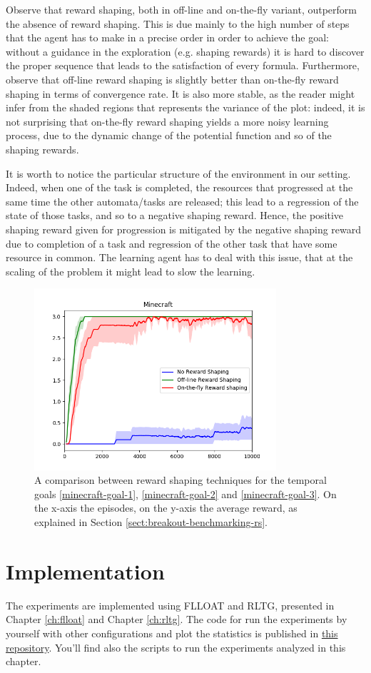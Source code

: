 Observe that reward shaping, both in off-line and on-the-fly variant, outperform the absence of reward shaping. This is due mainly to the high number of steps that the agent has to make in a precise order in order to achieve the goal: without a guidance in the exploration (e.g. shaping rewards) it is hard to discover the proper sequence that leads to the satisfaction of every formula. Furthermore, observe that off-line reward shaping is slightly better than on-the-fly reward shaping in terms of convergence rate. It is also more stable, as the reader might infer from the shaded regions that represents the variance of the plot: indeed, it is not surprising that on-the-fly reward shaping yields a more noisy learning process, due to the dynamic change of the potential function and so of the shaping rewards.

It is worth to notice the particular structure of the environment in our setting. Indeed, when one of the task is completed, the resources that progressed at the same time the other automata/tasks are released; this lead to a regression of the state of those tasks, and so to a negative shaping reward. Hence, the positive shaping reward given for progression is mitigated by the negative shaping reward due to completion of a task and regression of the other task that have some resource in common. The learning agent has to deal with this issue, that at the scaling of the problem it might lead to slow the learning.
	

\begin{figure}
	\centering
	\includegraphics[width=0.8\textwidth]{images/minecraft-comparison.png}
	\caption{A comparison between reward shaping techniques for the temporal goals \ref{minecraft-goal-1}, \ref{minecraft-goal-2} and \ref{minecraft-goal-3}. On the x-axis the episodes, on the y-axis the average reward, as explained in Section \ref{sect:breakout-benchmarking-rs}.}
	\label{fig:minecraft-comparison}
\end{figure}


\section{Implementation}
The experiments are implemented using FLLOAT and RLTG, presented in Chapter \ref{ch:flloat} and Chapter \ref{ch:rltg}.
The code for run the experiments by yourself with other configurations and plot the statistics is published in \href{https://github.com/MarcoFavorito/rltg-examples}{this repository}. You'll find also the scripts to run the experiments analyzed in this chapter.